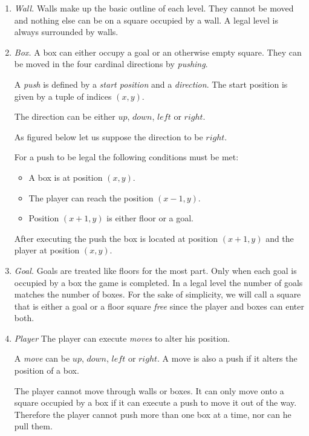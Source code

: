 \documentclass[runningheads]{llncs}
\begin{document}
\begin{enumerate}
\item \emph{Wall.} Walls make up the basic outline of each level. They cannot be
  moved and nothing else can be on a square occupied by a wall. A legal level is
  always surrounded by walls.

\item \emph{Box.} A box can either occupy a goal or an otherwise empty square. They can be
  moved in the four cardinal directions by \emph{pushing}.

  A \emph{push} is defined by a \emph{start position} and a \emph{direction}.
  The start position is given by a tuple of indices $(x,y)$.

  The direction can be either $up$, $down$, $left$ or $right$.

  As figured below let us suppose the direction to be $right$.

  For a push to be legal the following conditions must be met:
  \begin{itemize}
  \item A box is at position $(x, y)$.
  \item The player can reach the position $(x-1, y)$.
  \item Position $(x + 1, y)$ is either floor or a goal.
  \end{itemize}
  After executing the push the box is located at position $(x + 1, y)$ and the
  player at position $(x,y)$.


\item  \emph{Goal.} Goals are treated like floors for the most part. Only when
  each goal is occupied by a box the game is completed. In a legal level the
  number of goals matches the number of boxes. For the sake of simplicity, we
  will call a square that is either a goal or a floor square \emph{free} since
  the player and boxes can enter both.

\item \emph{Player} The player can execute \emph{moves} to alter his position.

  A \emph{move} can be $up$, $down$, $left$ or $right$. A move is also a push if
  it alters the position of a box.

  The player cannot move through walls or boxes. It can only move onto a square
  occupied by a box if it can execute a push to move it out of the way.
  Therefore the player cannot push more than one box at a time, nor can he pull
  them.
\end{enumerate}
\end{document}

